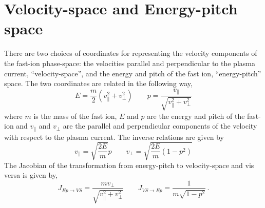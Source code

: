 \chapter{Velocity-space and Energy-pitch space}\label{app:ep2vs}
There are two choices of coordinates for representing the velocity components of the fast-ion phase-space: the velocities parallel and perpendicular to the plasma current, ``velocity-space'', and the energy and pitch of the fast ion, ``energy-pitch'' space.
The two coordinates are related in the following way,
$$ E = \frac{m}{2}\left ( v_{\parallel}^2 + v_{\perp}^2 \right) \qquad
p = \frac{v_{\parallel}}{\sqrt{v_{\parallel}^2 + v_{\perp}^2}}$$
where $m$ is the mass of the fast ion, $E$ and $p$ are the energy and pitch of the fast-ion and $v_\parallel$ and $v_\perp$ are the parallel and perpendicular components of the velocity with respect to the plasma current.
The inverse relations are given by
$$ v_\parallel = \sqrt{\frac{2E}{m}} p \qquad
v_\perp = \sqrt{\frac{2E}{m}(1-p^2)}$$
The Jacobian of the transformation from energy-pitch to velocity-space and vis versa is given by, 
$$J_{Ep\rightarrow VS} = \frac{m v_\perp}{\sqrt{v_{\parallel}^2 + v_{\perp}^2}} \qquad
J_{VS\rightarrow Ep} = {\frac{1}{m \sqrt{1-p^2}}}\,. $$